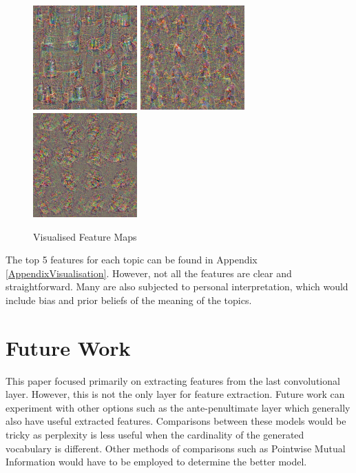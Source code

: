 \documentclass{article}
\begin{document}
\begin{figure}[h]
\centering
{}
{%
    \includegraphics[width=4cm]{342.jpg}
    \hspace{0.04\columnwidth}
}%
{%
    \includegraphics[width=4cm]{478.jpg}
    \hspace{0.04\columnwidth}
}%
{%
    \includegraphics[width=4cm]{413.jpg}
    \hspace*{\fill}
}%
\caption{Visualised Feature Maps} \label{img:Topic5feat}
\end{figure}

The top 5 features for each topic can be found in Appendix \ref{AppendixVisualisation}. However, not all the features are clear and straightforward. Many are also subjected to personal interpretation, which would include bias and prior beliefs of the meaning of the topics.  
\section{Future Work}
This paper focused primarily on extracting features from the last convolutional layer. However, this is not the only layer for feature extraction. Future work can experiment with other options such as the ante-penultimate layer which generally also have useful extracted features. Comparisons between these models would be tricky as perplexity is less useful when the  cardinality of the generated vocabulary is different. Other methods of comparisons such as Pointwise Mutual Information would have to be employed to determine the better model.
\end{document}
